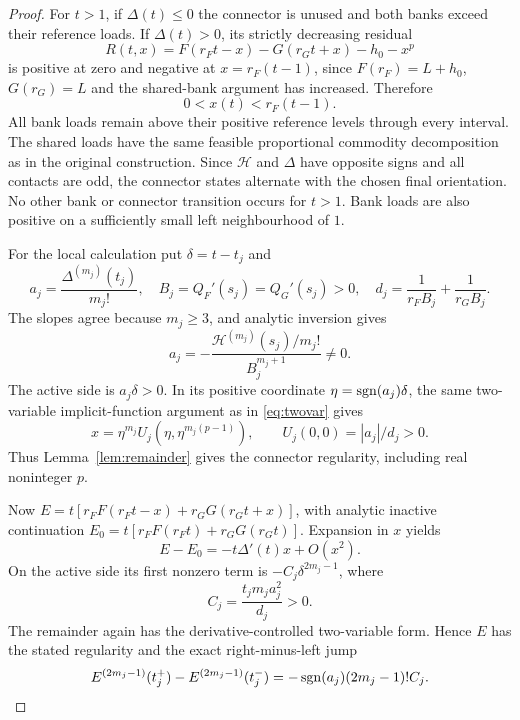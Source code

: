 \begin{proof}
For $t>1$, if $\Delta(t)\le0$ the connector is unused and both banks exceed their reference loads. If $\Delta(t)>0$, its strictly decreasing residual
\begin{equation}\label{mc:residual}
 R(t,x)=F(r_Ft-x)-G(r_Gt+x)-h_0-x^p
\end{equation}
is positive at zero and negative at $x=r_F(t-1)$, since $F(r_F)=L+h_0$, $G(r_G)=L$ and the shared-bank argument has increased. Therefore
\begin{equation}\label{mc:globalbank}
 0<x(t)<r_F(t-1).
\end{equation}
All bank loads remain above their positive reference levels through every interval. The shared loads have the same feasible proportional commodity decomposition as in the original construction. Since $\mathcal H$ and $\Delta$ have opposite signs and all contacts are odd, the connector states alternate with the chosen final orientation. No other bank or connector transition occurs for $t>1$. Bank loads are also positive on a sufficiently small left neighbourhood of $1$.

For the local calculation put $\delta=t-t_j$ and
\begin{equation}\label{mc:localconstants}
 a_j=\frac{\Delta^{(m_j)}(t_j)}{m_j!},\quad
 B_j=Q_F'(s_j)=Q_G'(s_j)>0,\quad
 d_j=\frac1{r_FB_j}+\frac1{r_GB_j}.
\end{equation}
The slopes agree because $m_j\ge3$, and analytic inversion gives
\begin{equation}
 a_j=-\frac{\mathcal H^{(m_j)}(s_j)/m_j!}{B_j^{m_j+1}}\ne0.
\end{equation}
The active side is $a_j\delta>0$. In its positive coordinate $\eta=\operatorname{sgn}(a_j)\delta$, the same two-variable implicit-function argument as in \eqref{eq:twovar} gives
\begin{equation}
 x=\eta^{m_j}U_j(\eta,\eta^{m_j(p-1)}),\qquad
 U_j(0,0)=|a_j|/d_j>0.
\end{equation}
Thus Lemma~\ref{lem:remainder} gives the connector regularity, including real noninteger $p$.

Now $E=t[r_FF(r_Ft-x)+r_GG(r_Gt+x)]$, with analytic inactive continuation $E_0=t[r_FF(r_Ft)+r_GG(r_Gt)]$. Expansion in $x$ yields
\begin{equation}
 E-E_0=-t\Delta'(t)x+O(x^2).
\end{equation}
On the active side its first nonzero term is $-C_j\delta^{2m_j-1}$, where
\begin{equation}\label{mc:costcoefficient}
 C_j=\frac{t_jm_ja_j^2}{d_j}>0.
\end{equation}
The remainder again has the derivative-controlled two-variable form. Hence $E$ has the stated regularity and the exact right-minus-left jump
\begin{equation}\label{mc:costjump}
 E^{(2m_j-1)}(t_j^+)-E^{(2m_j-1)}(t_j^-)
 =-\operatorname{sgn}(a_j)(2m_j-1)!C_j.
\end{equation}


\end{proof}
